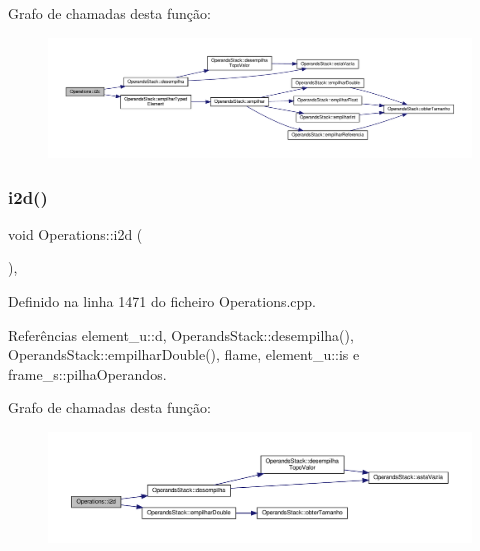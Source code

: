 Grafo de chamadas desta função\+:
\nopagebreak
\begin{figure}[H]
\begin{center}
\leavevmode
\includegraphics[width=350pt]{classOperations_a43b01132bf9acf598d0ced8719c194c7_cgraph}
\end{center}
\end{figure}
\mbox{\label{classOperations_aee9ee24acc934bcf51340dc54d6ed231}} 
\subsubsection{\texorpdfstring{i2d()}{i2d()}}
{\footnotesize\ttfamily void Operations\+::i2d (\begin{DoxyParamCaption}{ }\end{DoxyParamCaption})\hspace{0.3cm}{\ttfamily [static]}, {\ttfamily [private]}}



Definido na linha 1471 do ficheiro Operations.\+cpp.



Referências element\+\_\+u\+::d, Operands\+Stack\+::desempilha(), Operands\+Stack\+::empilhar\+Double(), flame, element\+\_\+u\+::is e frame\+\_\+s\+::pilha\+Operandos.

Grafo de chamadas desta função\+:
\nopagebreak
\begin{figure}[H]
\begin{center}
\leavevmode
\includegraphics[width=350pt]{classOperations_aee9ee24acc934bcf51340dc54d6ed231_cgraph}
\end{center}
\end{figure}
\mbox{\label{classOperations_a4880878630a620c325840fc7980dc131}} 
